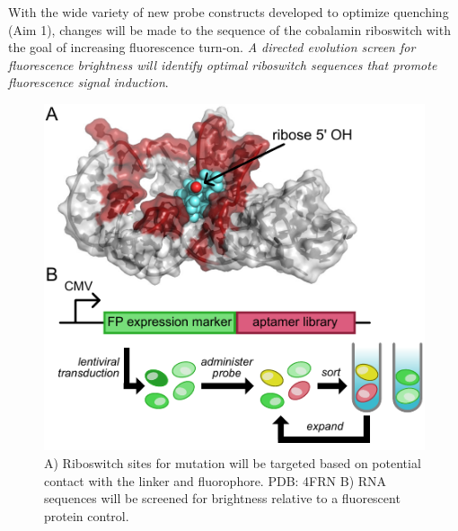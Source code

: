 With the wide variety of new probe constructs developed to optimize quenching (Aim 1), changes will be made to the sequence of the cobalamin riboswitch with the goal of increasing fluorescence turn-on. \textit{A directed evolution screen for fluorescence brightness will identify optimal riboswitch sequences that promote fluorescence signal induction}.

\begin{figure}
\begin{centering}
\includegraphics[width=\textwidth]{figures/aim2.pdf}

\end{centering}
\footnotesize
\caption{\label{figure:aim2}
A) Riboswitch sites for mutation will be targeted based on potential contact with the linker and fluorophore. PDB: 4FRN\cite{JohnsonJrB12cofactorsdirectly2012} B) RNA sequences will be screened for brightness relative to a fluorescent protein control.
}
\end{figure}


